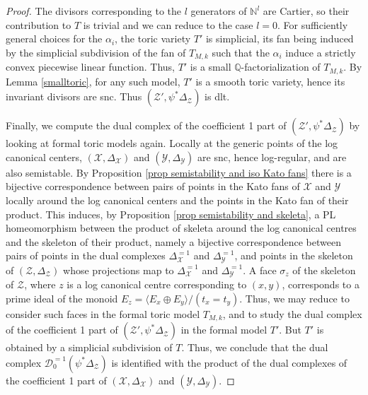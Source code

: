 \documentclass{amsart}%
\numberwithin{equation}{subsection}
\theoremstyle{plain2}
\theoremstyle{definition2}
\theoremstyle{stepstyle}
\theoremstyle{point}
\theoremstyle{subpoint}
\newcommand{\D}{{\mathcal D}}
\newcommand{\Q}{\ensuremath{\mathbb{Q}}}
\newcommand{\cX}{\ensuremath{\mathscr{X}}}
\newcommand{\cY}{\ensuremath{\mathscr{Y}}}
\newcommand{\cZ}{\ensuremath{\mathscr{Z}}}
\renewcommand{\cY}{\ensuremath{\mathscr{Y}}}
\begin{document}
\begin{proof}
The divisors corresponding to the $l$ generators of $\mathbb{N}^l$ are Cartier, so their contribution to $T$ is trivial and we can reduce to the case $l=0$. For sufficiently general choices for the $\alpha_i$, the toric variety $T'$ is simplicial, its fan being induced by the simplicial subdivision of the fan of $T_{M,k}$ such that the $\alpha_i$ induce a strictly convex piecewise linear function. Thus, $T'$ is a small $\Q$-factorialization of $T_{M,k}$. By Lemma \ref{smalltoric}, for any such model, $T'$ is a smooth toric variety, hence its invariant divisors are snc. Thus $(\cZ', \psi^*\Delta_\cZ)$ is dlt.

Finally, we compute the dual complex of the coefficient 1 part of $(\cZ', \psi^*\Delta_\cZ)$ by looking at formal toric models again. Locally at the generic points of the log canonical centers, $(\cX,\Delta_{\cX})$ and $(\cY,\Delta_{\cY})$ are snc, hence log-regular, and are also semistable. By Proposition \ref{prop semistability and iso Kato fans} there is a bijective correspondence between pairs of points in the Kato fans of $\cX$ and $\cY$ locally around the log canonical centers and the points in the Kato fan of their product. This induces, by Proposition \ref{prop semistability and skeleta}, a PL homeomorphism between the product of skeleta around the log canonical centres and the skeleton of their product, namely a bijective correspondence between pairs of points in the dual complexes $\Delta_{\cX}^{=1}$ and $\Delta_{\cY}^{=1}$, and points in the skeleton of $(\cZ,\Delta_{\cZ})$ whose projections map to $\Delta_{\cX}^{=1}$ and $\Delta_{\cY}^{=1}$. A face $\sigma_z$ of the skeleton of $\cZ$, where $z$ is a  log canonical centre corresponding to $(x,y)$, corresponds to a prime ideal of the monoid $E_z = \langle E_x \oplus E_y \rangle /(t_x=t_y)$. Thus, we may reduce to consider such faces in the formal toric model $T_{M,k}$, and to study the dual complex of the coefficient 1 part of $(\cZ',\psi^*\Delta_\cZ )$ in the formal model $T'$. But $T'$ is obtained by a simplicial subdivision of $T$. Thus, we conclude that the dual complex $\D^{=1}_0(\psi^*\Delta_\cZ)$ is identified with the product of the dual complexes of the coefficient 1 part of $(\cX,\Delta_{\cX})$ and $(\cY,\Delta_{\cY})$.
\end{proof}
\end{document}
